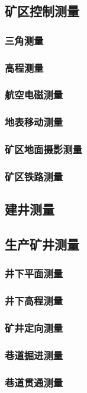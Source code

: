 \documentclass[UTF8]{../../ApplicationUniverse}
\begin{document}
    \subsection{矿区控制测量}
        \subsubsection{三角测量}
        \subsubsection{高程测量}
        \subsubsection{航空电磁测量}
        \subsubsection{地表移动测量}
        \subsubsection{矿区地面摄影测量}
        \subsubsection{矿区铁路测量}
    \subsection{建井测量}
    \subsection{生产矿井测量}
        \subsubsection{井下平面测量}
        \subsubsection{井下高程测量}
        \subsubsection{矿井定向测量}
        \subsubsection{巷道掘进测量}
        \subsubsection{巷道贯通测量}
\end{document}

